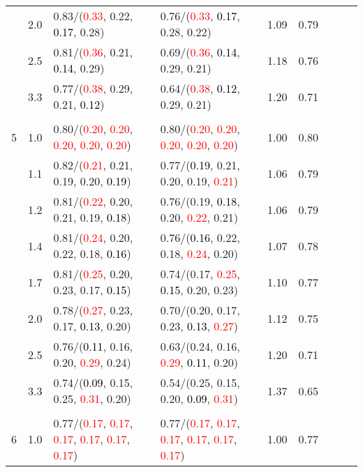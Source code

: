 \documentclass[10pt,a4paper]{report}
\begin{document}
\begin{table}[!htbp]
\begin{center}
{\begin{tabular}{ccllccccc}
			&2.0&0.83/(\textcolor{red}{0.33}, 0.22, \textcolor{black}{0.17}, 0.28)&0.76/(\textcolor{red}{0.33}, \textcolor{black}{0.17}, 0.28, 0.22)&1.09&0.79\\
			&2.5&0.81/(\textcolor{red}{0.36}, 0.21, \textcolor{black}{0.14}, 0.29)&0.69/(\textcolor{red}{0.36}, \textcolor{black}{0.14}, 0.29, 0.21)&1.18&0.76\\
			&3.3&0.77/(\textcolor{red}{0.38}, 0.29, 0.21, \textcolor{black}{0.12})&0.64/(\textcolor{red}{0.38}, \textcolor{black}{0.12}, 0.29, 0.21)&1.20&0.71\\
			&&&&\\
			5			&1.0&0.80/(\textcolor{red}{0.20}, \textcolor{red}{0.20}, \textcolor{red}{0.20}, \textcolor{red}{0.20}, \textcolor{red}{0.20})&0.80/(\textcolor{red}{0.20}, \textcolor{red}{0.20}, \textcolor{red}{0.20}, \textcolor{red}{0.20}, \textcolor{red}{0.20})&1.00&0.80\\
			&1.1&0.82/(\textcolor{red}{0.21}, 0.21, 0.19, 0.20, \textcolor{black}{0.19})&0.77/(\textcolor{black}{0.19}, 0.21, 0.20, 0.19, \textcolor{red}{0.21})&1.06&0.79\\
			&1.2&0.81/(\textcolor{red}{0.22}, 0.20, 0.21, 0.19, \textcolor{black}{0.18})&0.76/(0.19, \textcolor{black}{0.18}, 0.20, \textcolor{red}{0.22}, 0.21)&1.06&0.79\\
			&1.4&0.81/(\textcolor{red}{0.24}, 0.20, 0.22, 0.18, \textcolor{black}{0.16})&0.76/(\textcolor{black}{0.16}, 0.22, 0.18, \textcolor{red}{0.24}, 0.20)&1.07&0.78\\
			&1.7&0.81/(\textcolor{red}{0.25}, 0.20, 0.23, 0.17, \textcolor{black}{0.15})&0.74/(0.17, \textcolor{red}{0.25}, \textcolor{black}{0.15}, 0.20, 0.23)&1.10&0.77\\
			&2.0&0.78/(\textcolor{red}{0.27}, 0.23, 0.17, \textcolor{black}{0.13}, 0.20)&0.70/(0.20, 0.17, 0.23, \textcolor{black}{0.13}, \textcolor{red}{0.27})&1.12&0.75\\
			&2.5&0.76/(\textcolor{black}{0.11}, 0.16, 0.20, \textcolor{red}{0.29}, 0.24)&0.63/(0.24, 0.16, \textcolor{red}{0.29}, \textcolor{black}{0.11}, 0.20)&1.20&0.71\\
			&3.3&0.74/(\textcolor{black}{0.09}, 0.15, 0.25, \textcolor{red}{0.31}, 0.20)&0.54/(0.25, 0.15, 0.20, \textcolor{black}{0.09}, \textcolor{red}{0.31})&1.37&0.65\\
			&&&&\\
			6			&1.0&0.77/(\textcolor{red}{0.17}, \textcolor{red}{0.17}, \textcolor{red}{0.17}, \textcolor{red}{0.17}, \textcolor{red}{0.17}, \textcolor{red}{0.17})&0.77/(\textcolor{red}{0.17}, \textcolor{red}{0.17}, \textcolor{red}{0.17}, \textcolor{red}{0.17}, \textcolor{red}{0.17}, \textcolor{red}{0.17})&1.00&0.77\\

\end{tabular}}
\end{center}
\end{table}
\end{document}
